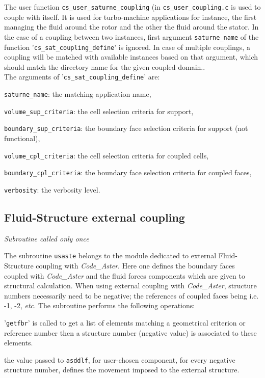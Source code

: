 {{{The user function \texttt{cs\_user\_saturne\_coupling} (in
 \texttt{cs\_user\_coupling.c} is used to couple \CS with itself.
 It is used for turbo-machine applications for instance, the first \CS managing
 the fluid around the rotor and the other the fluid around the stator.
In the case of a coupling between two \CS instances, first argument \texttt{saturne\_name}
 of the function '\texttt{cs\_sat\_coupling\_define}' is ignored.
 In case of multiple couplings, a coupling will be matched with available \CS
 instances based on that argument, which should match the directory name for the
 given coupled domain..\\
The arguments of '\texttt{cs\_sat\_coupling\_define}' are:
\begin{list}{-}{}
\item \texttt{saturne\_name}: the matching \CS application name,
\item \texttt{volume\_sup\_criteria}: the cell selection criteria for support,
\item \texttt{boundary\_sup\_criteria}: the boundary face selection criteria for support (not functional),
\item \texttt{volume\_cpl\_criteria}: the cell selection criteria for coupled cells,
\item \texttt{boundary\_cpl\_criteria}: the boundary face selection criteria for coupled faces,
\item \texttt{verbosity}: the verbosity level.
\end{list}


\subsection{Fluid-Structure external coupling}

\noindent
\textit{Subroutine called only once}

The subroutine \texttt{usaste} belongs to the module dedicated to external
 Fluid-Structure coupling with \textit{Code\_Aster}. Here one defines the boundary
 faces coupled with \textit{Code\_Aster} and the fluid forces components which are
 given to structural calculation. When using external coupling with \textit{Code\_Aster},
 structure numbers necessarily need to be negative; the references of coupled faces being
 i.e. -1, -2, \emph{etc.}
The subroutine performs the following operations:
\begin{list}{-}{}
 \item '\texttt{getfbr}' is called to get a list of elements matching a
geometrical criterion or reference number then a structure number (negative value) is associated
 to these elements.
 \item the value passed to \texttt{asddlf}, for user-chosen component, for every negative
 structure number, defines the movement imposed to the external structure.
\end{list}

}}}
